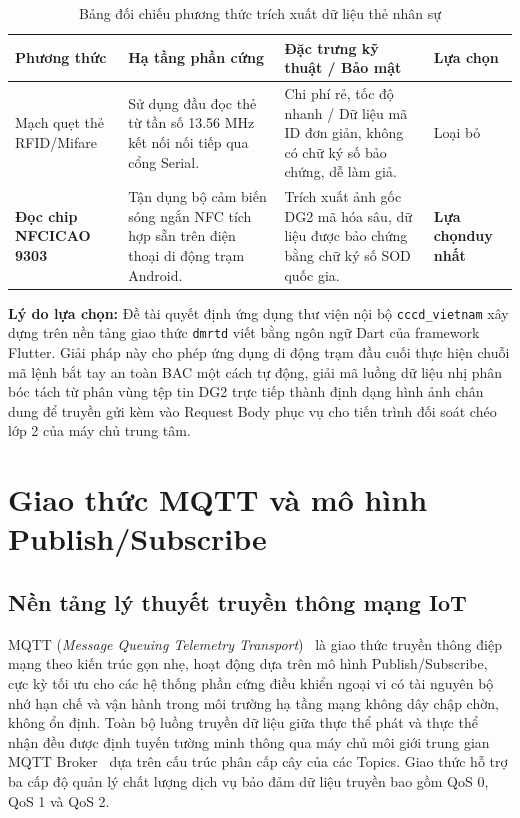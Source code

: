 ﻿\documentclass[../DoAn.tex]{subfiles}
\begin{document}
\begin{table}[ht!]
\centering
\small
\renewcommand{\arraystretch}{1.3}
\caption{Bảng đối chiếu phương thức trích xuất dữ liệu thẻ nhân sự}
\label{tab:nfc_comparison}
\begin{tabular}{|>{\raggedright\arraybackslash}p{2.3cm}|>{\raggedright\arraybackslash}p{4.5cm}|>{\raggedright\arraybackslash}p{5.5cm}|>{\centering\arraybackslash}p{1.7cm}|}
\hline
\textbf{Phương thức} & \textbf{Hạ tầng phần cứng} & \textbf{Đặc trưng kỹ thuật / Bảo mật} & \textbf{Lựa chọn} \\ \hline
Mạch quẹt thẻ RFID/Mifare & Sử dụng đầu đọc thẻ từ tần số 13.56 MHz kết nối nối tiếp qua cổng Serial. & Chi phí rẻ, tốc độ nhanh / Dữ liệu mã ID đơn giản, không có chữ ký số bảo chứng, dễ làm giả. & Loại bỏ \\ \hline
\textbf{Đọc chip NFC\newline ICAO 9303} & Tận dụng bộ cảm biến sóng ngắn NFC tích hợp sẵn trên điện thoại di động trạm Android. & Trích xuất ảnh gốc DG2 mã hóa sâu, dữ liệu được bảo chứng bằng chữ ký số SOD quốc gia. & \textbf{Lựa chọn\newline duy nhất} \\ \hline
\end{tabular}
\end{table}

\textbf{Lý do lựa chọn:} Đề tài quyết định ứng dụng thư viện nội bộ \texttt{cccd\_vietnam} xây dựng trên nền tảng giao thức \texttt{dmrtd} viết bằng ngôn ngữ Dart của framework Flutter. Giải pháp này cho phép ứng dụng di động trạm đầu cuối thực hiện chuỗi mã lệnh bắt tay an toàn BAC một cách tự động, giải mã luồng dữ liệu nhị phân bóc tách từ phân vùng tệp tin DG2 trực tiếp thành định dạng hình ảnh chân dung để truyền gửi kèm vào Request Body phục vụ cho tiến trình đối soát chéo lớp 2 của máy chủ trung tâm.

\clearpage

\section{Giao thức MQTT và mô hình Publish/Subscribe}
\label{section:3.3}

\subsection{Nền tảng lý thuyết truyền thông mạng IoT}

MQTT (\textit{Message Queuing Telemetry Transport})~\cite{mqtt5} là giao thức truyền thông điệp mạng theo kiến trúc gọn nhẹ, hoạt động dựa trên mô hình Publish/Subscribe, cực kỳ tối ưu cho các hệ thống phần cứng điều khiển ngoại vi có tài nguyên bộ nhớ hạn chế và vận hành trong môi trường hạ tầng mạng không dây chập chờn, không ổn định. Toàn bộ luồng truyền dữ liệu giữa thực thể phát và thực thể nhận đều được định tuyến tường minh thông qua máy chủ môi giới trung gian MQTT Broker~\cite{hivemq} dựa trên cấu trúc phân cấp cây của các Topics. Giao thức hỗ trợ ba cấp độ quản lý chất lượng dịch vụ bảo đảm dữ liệu truyền bao gồm QoS 0, QoS 1 và QoS 2.
\end{document}
